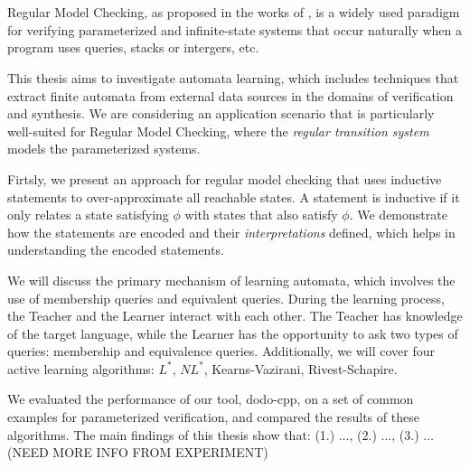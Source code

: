 \chapter{\abstractname}

Regular Model Checking, as proposed in the works of \cite*{bouajjani2000regular}, is a 
widely used paradigm for verifying parameterized and infinite-state systems that 
occur naturally when a program uses queries, stacks or intergers, etc.



This thesis aims to investigate automata learning,
which includes techniques that extract finite automata 
from external data sources in the domains of verification and synthesis.
We are considering an application scenario that is particularly well-suited for Regular Model Checking, 
where the \textit{regular transition system} models the parameterized systems.

Firtsly, we present an approach for regular model checking that uses inductive statements to over-approximate all reachable states.
A statement is inductive if it only relates a state satisfying $\phi$ with states that also satisfy $\phi$.
We demonstrate how the statements are encoded and their \textit{interpretations} defined, 
which helps in understanding the encoded statements.

We will discuss the primary mechanism of learning automata, which involves the use of 
membership queries and equivalent queries. 
During the learning process, the Teacher and the Learner interact with each other. 
The Teacher has knowledge of the target language, 
while the Learner has the opportunity to ask two types of queries: membership and equivalence queries.
Additionally, we will cover four active learning algorithms: $L^*$, $NL^*$, Kearns-Vazirani, Rivest-Schapire.

We evaluated the performance of our tool, dodo-cpp, on a set of common examples for parameterized verification, 
and compared the results of these algorithms.
The main findings of this thesis show that: (1.) $\dots$, (2.) $\dots$, (3.) $\dots$ (NEED MORE INFO FROM EXPERIMENT)


